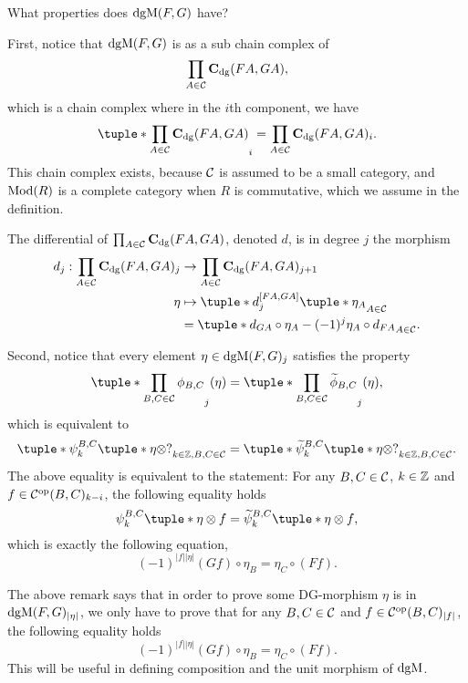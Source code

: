 \begin{remark}
    What properties does \( \operatorname{dgM}(F, G) \) have?

    First, notice that \( \operatorname{dgM}(F, G) \) is as a sub chain complex of
    \[
        \prod_{A \in {\mathcal{C}}} \operatorname{\mathbf{C}}_{\operatorname{dg}}(F A, G A),
    \]
    which is a chain complex where in the \( i \)th component, we have
    \[
        \tuple*{ \prod_{A \in \Cc} \C_{\dg}(F A, G A) }_i = \prod_{A \in \Cc} \C_{\dg}(F A, G A)_i.
    \]
    This chain complex exists, because \( {\mathcal{C}} \) is assumed to be a small category, and \( \operatorname{Mod}(R) \) is a complete category when \( R \) is commutative, which we assume in the definition.

    The differential of \( \prod_{A \in {\mathcal{C}}} \operatorname{\mathbf{C}}_{\operatorname{dg}}(F A, G A) \), denoted \( d \), is in degree \( j \) the morphism
    \begin{align*}
        d_j: \prod_{A \in \Cc} \C_{\dg}(F A, G A)_j &\to \prod_{A \in \Cc} \C_{\dg}(F A, G A)_{j + 1} \\
        \eta &\mapsto \tuple*{ d_j^{[F A, G A]}\tuple*{ \eta_A } }_{A \in \Cc} \\
        &= \tuple*{ d_{G A} \circ \eta_A - (-1)^j \eta_A \circ d_{F A} }_{A \in \Cc}.
    \end{align*}

    Second, notice that every element \( \eta \in \operatorname{dgM}(F, G)_j \) satisfies the property
    \[
        \tuple*{ \prod\limits_{B, C \in \Cc} \phi_{B, C} }_j (\eta) = \tuple*{ \prod_{B, C \in \Cc} \widetilde{\phi}_{B, C} }_j (\eta),
    \]
    which is equivalent to
    \[
        \tuple*{ \psi_k^{B, C}\tuple*{ \eta \otimes ? } }_{k \in \Zb, B, C \in \Cc} = \tuple*{ \widetilde{\psi}_k^{B, C}\tuple*{ \eta \otimes ? } }_{k \in \Zb, B, C \in \Cc}.
    \]
    The above equality is equivalent to the statement: For any \( B, C \in {\mathcal{C}} \), \( k \in {\mathbb{Z}} \) and \( f \in {\mathcal{C}}^{\operatorname{op}}(B, C)_{k - i} \), the following equality holds
    \[
        \psi_k^{B, C}\tuple*{ \eta \otimes f } = \widetilde{\psi}_k^{B, C} \tuple*{ \eta \otimes f },
    \]
    which is exactly the following equation,
    \[
        (-1)^{|f||\eta|}(G f) \circ \eta_B = \eta_C \circ (F f).
    \]
\end{remark}

The above remark says that in order to prove some DG-morphism \( \eta \) is in \( \operatorname{dgM}(F, G)_{|\eta|} \), we only have to prove that for any \( B, C \in {\mathcal{C}} \) and \( f \in {\mathcal{C}}^{\operatorname{op}}(B, C)_{|f|} \), the following equality holds
\[
        (-1)^{|f||\eta|}(G f) \circ \eta_B = \eta_C \circ (F f).
\]
This will be useful in defining composition and the unit morphism of \( \operatorname{dgM} \).


